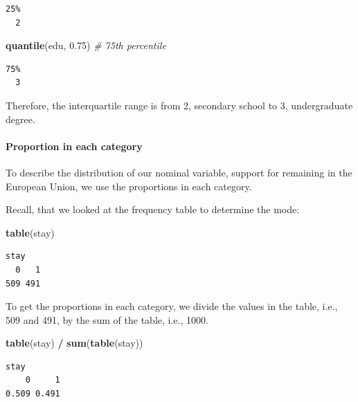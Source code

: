 \documentclass[]{article}
\newenvironment{Shaded}{\begin{snugshade}}{\end{snugshade}}
\newcommand{\KeywordTok}[1]{\textcolor[rgb]{0.13,0.29,0.53}{\textbf{#1}}}
\newcommand{\FloatTok}[1]{\textcolor[rgb]{0.00,0.00,0.81}{#1}}
\newcommand{\StringTok}[1]{\textcolor[rgb]{0.31,0.60,0.02}{#1}}
\newcommand{\CommentTok}[1]{\textcolor[rgb]{0.56,0.35,0.01}{\textit{#1}}}
\newcommand{\OperatorTok}[1]{\textcolor[rgb]{0.81,0.36,0.00}{\textbf{#1}}}
\newcommand{\NormalTok}[1]{#1}
\let\oldparagraph\paragraph
\renewcommand{\paragraph}[1]{\oldparagraph{#1}\mbox{}}
\theoremstyle{definition}
\theoremstyle{definition}
\theoremstyle{definition}
\theoremstyle{remark}
\begin{document}
\begin{verbatim}
25% 
  2 
\end{verbatim}

\begin{Shaded}
\begin{Highlighting}[]
\KeywordTok{quantile}\NormalTok{(edu, }\FloatTok{0.75}\NormalTok{) }\CommentTok{# 75th percentile}
\end{Highlighting}
\end{Shaded}

\begin{verbatim}
75% 
  3 
\end{verbatim}

Therefore, the interquartile range is from 2, secondary school to 3,
undergraduate degree.

\paragraph{Proportion in each
category}\label{proportion-in-each-category}

To describe the distribution of our nominal variable, support for
remaining in the European Union, we use the proportions in each
category.

Recall, that we looked at the frequency table to determine the mode:

\begin{Shaded}
\begin{Highlighting}[]
\KeywordTok{table}\NormalTok{(stay)}
\end{Highlighting}
\end{Shaded}

\begin{verbatim}
stay
  0   1 
509 491 
\end{verbatim}

To get the proportions in each category, we divide the values in the
table, i.e., 509 and 491, by the sum of the table, i.e., 1000.

\begin{Shaded}
\begin{Highlighting}[]
\KeywordTok{table}\NormalTok{(stay) }\OperatorTok{/}\StringTok{ }\KeywordTok{sum}\NormalTok{(}\KeywordTok{table}\NormalTok{(stay))}
\end{Highlighting}
\end{Shaded}

\begin{verbatim}
stay
    0     1 
0.509 0.491 
\end{verbatim}
\end{document}

